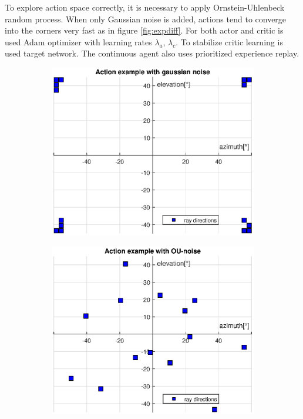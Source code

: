 \pagebreak
To explore action space correctly, it is necessary to apply Ornstein-Uhlenbeck random process. When only Gaussian noise is added, actions tend to converge into the corners very fast as in figure \ref{fig:expdiff}. For both actor and critic is used Adam optimizer with learning rates $\lambda_{a}$, $\lambda_{c}$. To stabilize critic learning is used target network. The continuous agent also uses prioritized experience replay.

\begin{figure}[H]
\begin{subfigure}[h]{0.5\linewidth}
\includegraphics[width=\linewidth]{fig/wrong_action.eps}
\end{subfigure}
\hfill
\begin{subfigure}[h]{0.5\linewidth}
\includegraphics[width=\linewidth]{fig/right_action.eps}

\end{subfigure}
\end{figure}

